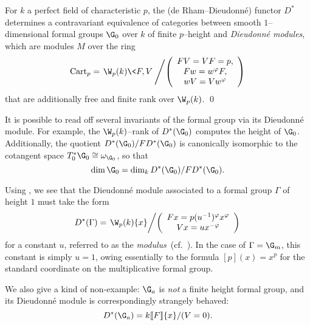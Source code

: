 \begin{theorem}\label{MainContraDieudonneThm}
For \(k\) a perfect field of characteristic \(p\), the (de Rham--Dieudonn\'e) functor \(D^*\) determines a contravariant equivalence of categories between smooth \(1\)--dimensional formal groups \(\G_0\) over \(k\) of finite \(p\)--height and \textit{Dieudonn\'e modules}, which are modules \(M\) over the ring \[\Cart_p = \left. \W_p(k)\<F,V\> \middle/ \left( \begin{array}{c} FV = VF = p, \\ Fw = w^\phi F, \\ wV = Vw^\phi \end{array} \right) \right.\] that are additionally free and finite rank over \(\W_p(k)\). \qed
\end{theorem}

\begin{remark}\label{InvariantsFromDModule}
It is possible to read off several invariants of the formal group via its Dieudonn\'e module.  For example, the \(\W_p(k)\)--rank of \(D^*(\G_0)\) computes the height of \(\G_0\).  Additionally, the quotient \(D^*(\G_0) / FD^*(\G_0)\) is canonically isomorphic to the cotangent space \(T_0^* \G_0 \cong \omega_{\G_0}\), so that \[\dim \G_0 = \dim_k D^*(\G_0) / FD^*(\G_0).\]
\end{remark}

\begin{example}
Using , we see that the Dieudonn\'e module associated to a formal group \(\Gamma\) of height \(1\) must take the form \[D^*(\Gamma) = \left. \W_p(k)\{x\} \middle/ \left( \begin{array}{c} Fx = p (u^{-1})^\phi x^\phi \\ Vx = u x^{-\phi} \end{array} \right)\right.\] for a constant \(u\), referred to as the \textit{modulus}~(cf.\ \cite[Theorem 4.2.2]{MoravaFormsOfKthy}).  In the case of \(\Gamma = \G_m\), this constant is simply \(u = 1\), owing essentially to the formula \([p](x) = x^p\) for the standard coordinate on the multiplicative formal group.
\end{example}

\begin{example}
We also give a kind of non-example: \(\G_a\) is \emph{not} a finite height formal group, and its Dieudonn\'e module is correspondingly strangely behaved: \[D^*(\G_a) = k\ps{F}\{x\} / (V = 0).\]
\end{example}

